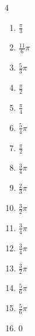 \begin{multicols}{4}
\begin{enumerate}
  \item $\displaystyle \frac{\pi}{3}$

  \item $\displaystyle \frac{11}{6}\pi$

  \item $\displaystyle \frac{5}{3}\pi$

  \item $\displaystyle \frac{\pi}{2}$

  \item $\displaystyle \frac{\pi}{4}$

  \item $\displaystyle \frac{5}{4}\pi$

  \item $\displaystyle \frac{\pi}{2}$

  \item $\displaystyle \frac{3}{4}\pi$

  \item $\displaystyle \frac{2}{3}\pi$

  \item $\displaystyle \frac{3}{2}\pi$

  \item $\displaystyle \frac{3}{4}\pi$

  \item $\displaystyle \frac{3}{4}\pi$

  \item $\displaystyle \frac{3}{2}\pi$

  \item $\displaystyle \frac{5}{6}\pi$

  \item $\displaystyle \frac{5}{6}\pi$

  \item $\displaystyle 0$


\end{enumerate}
\end{multicols}
